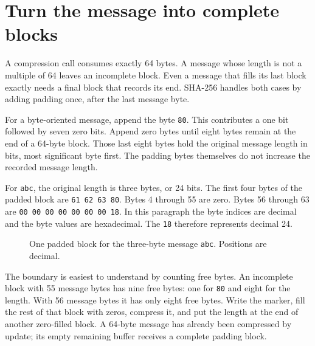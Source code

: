 \section{Turn the message into complete blocks}
A compression call consumes exactly 64 bytes. A message whose length is not a multiple
of 64 leaves an incomplete block. Even a message that fills its last block exactly
needs a final block that records its end. SHA-256 handles both cases by adding padding
once, after the last message byte.

For a byte-oriented message, append the byte \texttt{80}. This contributes a one bit
followed by seven zero bits. Append zero bytes until eight bytes remain at the end of
a 64-byte block. Those last eight bytes hold the original message length in bits,
most significant byte first. The padding bytes themselves do not increase the recorded
message length.

For \texttt{abc}, the original length is three bytes, or 24 bits. The first four
bytes of the padded block are \texttt{61 62 63 80}. Bytes 4 through 55 are zero.
Bytes 56 through 63 are \texttt{00 00 00 00 00 00 00 18}. In this paragraph the
byte indices are decimal and the byte values are hexadecimal. The \texttt{18}
therefore represents decimal 24.

\begin{figure}[htbp]
  \centering
  \caption{One padded block for the three-byte message \texttt{abc}. Positions are decimal.}
\end{figure}

The boundary is easiest to understand by counting free bytes. An incomplete block with
55 message bytes has nine free bytes: one for \texttt{80} and eight for the length.
With 56 message bytes it has only eight free bytes. Write the marker, fill the rest
of that block with zeros, compress it, and put the length at the end of another
zero-filled block. A 64-byte message has already been compressed by update; its
empty remaining buffer receives a complete padding block.


